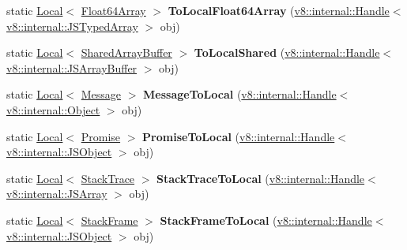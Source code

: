\begin{DoxyCompactItemize}
\item 
static \hyperlink{classv8_1_1_local}{Local}$<$ \hyperlink{classv8_1_1_float64_array}{Float64\+Array} $>$ {\bfseries To\+Local\+Float64\+Array} (\hyperlink{classv8_1_1internal_1_1_handle}{v8\+::internal\+::\+Handle}$<$ \hyperlink{classv8_1_1internal_1_1_j_s_typed_array}{v8\+::internal\+::\+J\+S\+Typed\+Array} $>$ obj)\hypertarget{classv8_1_1_utils_a64bca553c7a7e8dd818e10c937ba0f22}{}\label{classv8_1_1_utils_a64bca553c7a7e8dd818e10c937ba0f22}

\item 
static \hyperlink{classv8_1_1_local}{Local}$<$ \hyperlink{classv8_1_1_shared_array_buffer}{Shared\+Array\+Buffer} $>$ {\bfseries To\+Local\+Shared} (\hyperlink{classv8_1_1internal_1_1_handle}{v8\+::internal\+::\+Handle}$<$ \hyperlink{classv8_1_1internal_1_1_j_s_array_buffer}{v8\+::internal\+::\+J\+S\+Array\+Buffer} $>$ obj)\hypertarget{classv8_1_1_utils_a09a6164d349d6cc5deb6fa6078e853b5}{}\label{classv8_1_1_utils_a09a6164d349d6cc5deb6fa6078e853b5}

\item 
static \hyperlink{classv8_1_1_local}{Local}$<$ \hyperlink{classv8_1_1_message}{Message} $>$ {\bfseries Message\+To\+Local} (\hyperlink{classv8_1_1internal_1_1_handle}{v8\+::internal\+::\+Handle}$<$ \hyperlink{classv8_1_1internal_1_1_object}{v8\+::internal\+::\+Object} $>$ obj)\hypertarget{classv8_1_1_utils_abb489951956cbf3fa09c36322a2377f3}{}\label{classv8_1_1_utils_abb489951956cbf3fa09c36322a2377f3}

\item 
static \hyperlink{classv8_1_1_local}{Local}$<$ \hyperlink{classv8_1_1_promise}{Promise} $>$ {\bfseries Promise\+To\+Local} (\hyperlink{classv8_1_1internal_1_1_handle}{v8\+::internal\+::\+Handle}$<$ \hyperlink{classv8_1_1internal_1_1_j_s_object}{v8\+::internal\+::\+J\+S\+Object} $>$ obj)\hypertarget{classv8_1_1_utils_a31171eb233e3f46d9eb158b5db59f184}{}\label{classv8_1_1_utils_a31171eb233e3f46d9eb158b5db59f184}

\item 
static \hyperlink{classv8_1_1_local}{Local}$<$ \hyperlink{classv8_1_1_stack_trace}{Stack\+Trace} $>$ {\bfseries Stack\+Trace\+To\+Local} (\hyperlink{classv8_1_1internal_1_1_handle}{v8\+::internal\+::\+Handle}$<$ \hyperlink{classv8_1_1internal_1_1_j_s_array}{v8\+::internal\+::\+J\+S\+Array} $>$ obj)\hypertarget{classv8_1_1_utils_abbe80959ee27b18d63b8b7e63a9cd851}{}\label{classv8_1_1_utils_abbe80959ee27b18d63b8b7e63a9cd851}

\item 
static \hyperlink{classv8_1_1_local}{Local}$<$ \hyperlink{classv8_1_1_stack_frame}{Stack\+Frame} $>$ {\bfseries Stack\+Frame\+To\+Local} (\hyperlink{classv8_1_1internal_1_1_handle}{v8\+::internal\+::\+Handle}$<$ \hyperlink{classv8_1_1internal_1_1_j_s_object}{v8\+::internal\+::\+J\+S\+Object} $>$ obj)\hypertarget{classv8_1_1_utils_adf9510d8c676ed3c2ab1fdac58de245e}{}\label{classv8_1_1_utils_adf9510d8c676ed3c2ab1fdac58de245e}


\end{DoxyCompactItemize}
